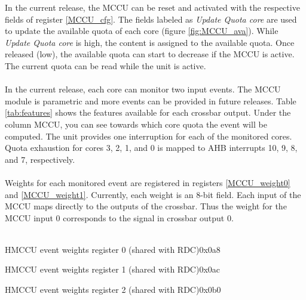 In the current release, the MCCU can be reset and activated with the respective fields of register \ref{MCCU_cfg}. The fields labeled as \textit{Update Quota core} are used to update the available quota of each core (figure \ref{fig:MCCU_ava}). While  \textit{Update Quota core} is high, the content is assigned to the available quota. Once released (low), the available quota can start to decrease if the MCCU is active. The current quota can be read while the unit is active.\\
\\
In the current release, each core can monitor two input events. The MCCU module is parametric and more events can be provided in future releases.  Table \ref{tab:features} shows the features available for each crossbar output. Under the column MCCU, you can see towards which core quota the event will be computed.
The unit provides one interruption for each of the monitored cores. Quota exhaustion for cores 3, 2, 1, and 0 is mapped to AHB interrupts 10, 9, 8, and 7, respectively.\\
\\
Weights for each monitored event are registered in registers \ref{MCCU_weight0} and \ref{MCCU_weight1}. Currently, each weight is an 8-bit field. Each input of the MCCU maps directly to the outputs of the crossbar. Thus the weight for the MCCU input 0 corresponds to the signal in crossbar output 0.\\
\\
\begin{register}{H}{MCCU event weights register 0 (shared with RDC)}{0x0a8}
	\label{MCCU_weight0}
	\regnewline
\end{register}
\begin{register}{H}{MCCU event weights register 1 (shared with RDC)}{0x0ac}
	\label{MCCU_weight1}
	\regnewline
\end{register}
\begin{register}{H}{MCCU event weights register 2 (shared with RDC)}{0x0b0}
	\label{MCCU_weight1}
	\regnewline
\end{register}

